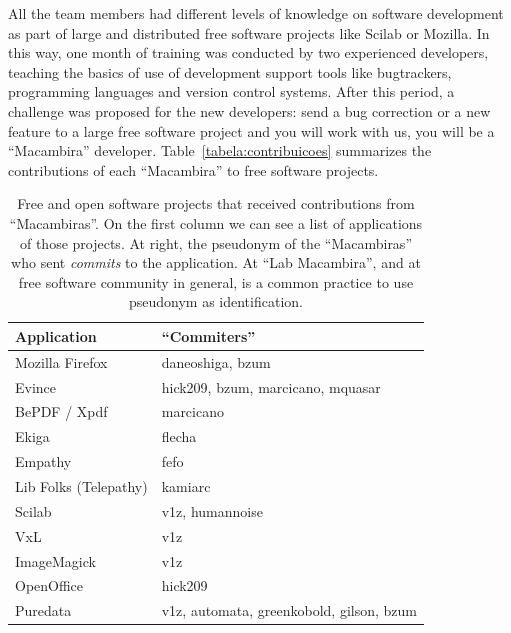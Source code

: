 \documentclass[letterpaper]{article}
\begin{document}
All the team members had different levels of knowledge on software development
as part of large and distributed free software projects like Scilab or
Mozilla. In this way, one month of training was conducted by two experienced
developers, teaching the basics of use of development support tools like
bugtrackers, programming languages and version control systems. After this
period, a challenge was proposed for the new developers: send a bug correction
or a new feature to a large free software project and you will work with us, you
will be a ``Macambira'' developer. Table~\ref{tabela:contribuicoes} summarizes
the contributions of each ``Macambira'' to free software projects.


\begin{table}
  \caption{Free and open software projects that received contributions
    from ``Macambiras''. On the first column we can see a list of
    applications of those projects. At right, the pseudonym of the
    ``Macambiras'' who sent \textit{commits} to the application. At
    ``Lab Macambira'', and at free software community in general, is a
    common practice to use pseudonym as identification.}
    \small\begin{tabular}{|l|l|}
        \hline
        Application           & ``Commiters''                       \\
        \hline \hline
        Mozilla Firefox       & daneoshiga, bzum                    \\
        Evince                & hick209, bzum, marcicano, mquasar   \\
        BePDF / Xpdf          & marcicano                           \\
        Ekiga                 & flecha                              \\
        Empathy               & fefo                                \\
        Lib Folks (Telepathy) & kamiarc                             \\
        Scilab                & v1z, humannoise                     \\
        VxL                   & v1z                                 \\
        ImageMagick           & v1z                                 \\
        OpenOffice            & hick209                             \\
        Puredata              & v1z, automata, greenkobold, gilson, bzum \\

\end{tabular}
\end{table}
\end{document}
